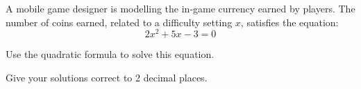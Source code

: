 \begin{question}
\noindent A mobile game designer is modelling the in-game currency earned by players. The number of coins earned, related to a difficulty setting $x$, satisfies the equation:
\[
2x^2 + 5x - 3 = 0
\]

\noindent Use the quadratic formula to solve this equation.

\noindent Give your solutions correct to 2 decimal places.
\vspace{5cm}
\end{question}
